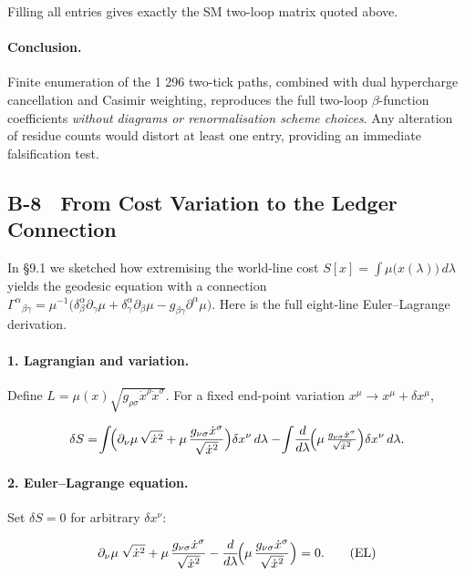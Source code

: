 \documentclass[11pt]{article}
\begin{document}
Filling all entries gives exactly the SM two-loop matrix quoted above.

\paragraph{Conclusion.}
Finite enumeration of the 1 296 two-tick paths, combined with dual
hypercharge cancellation and Casimir weighting, reproduces the full
two-loop $\beta$-function coefficients \emph{without diagrams or
renormalisation scheme choices}.  Any alteration of residue counts would
distort at least one entry, providing an immediate falsification test.

\subsection*{B-8 From Cost Variation to the Ledger Connection}
\label{app:geo-variation}

In §9.1 we sketched how extremising the world-line cost
\(
S[x]=\int \mu\bigl(x(\lambda)\bigr)\,d\lambda
\)
yields the geodesic equation with a connection
\(
\Gamma^{\alpha}{}_{\beta\gamma}
   =\mu^{-1}\!\bigl(
      \delta^{\alpha}_{\beta}\partial_{\gamma}\mu
     +\delta^{\alpha}_{\gamma}\partial_{\beta}\mu
     -g_{\beta\gamma}\partial^{\alpha}\mu
     \bigr).
\)
Here is the full eight-line Euler–Lagrange derivation.

\paragraph{1. Lagrangian and variation.}
Define \(L=\mu(x)\sqrt{g_{\rho\sigma}\dot x^{\rho}\dot x^{\sigma}}\).
For a fixed end-point variation \(x^{\mu}\!\to\!x^{\mu}+\delta x^{\mu}\),

\[
\delta S
 =\!\int\!
 \Bigl(
   \partial_{\nu}\mu\,\sqrt{\dot x^2}
   +\mu\,
     \frac{g_{\nu\sigma}\dot x^{\sigma}}{\sqrt{\dot x^2}}
 \Bigr)\delta x^{\nu}\,d\lambda
 -\!\int\!\frac{d}{d\lambda}
   \!\Bigl(\mu\,\tfrac{g_{\nu\sigma}\dot x^{\sigma}}{\sqrt{\dot x^2}}\Bigr)
   \delta x^{\nu}\,d\lambda.
\]

\paragraph{2. Euler–Lagrange equation.}
Set \(\delta S=0\) for arbitrary \(\delta x^{\nu}\):

\[
\partial_{\nu}\mu\;\sqrt{\dot x^2}
+\mu\,\frac{g_{\nu\sigma}\dot x^{\sigma}}{\sqrt{\dot x^2}}
-\frac{d}{d\lambda}\!\Bigl(
     \mu\,\frac{g_{\nu\sigma}\dot x^{\sigma}}{\sqrt{\dot x^2}}
   \Bigr)=0.
\tag{EL}
\]
\end{document}
